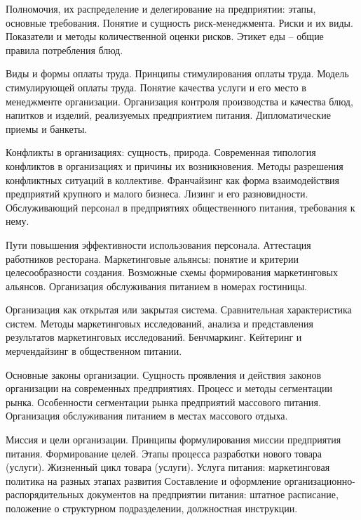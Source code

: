 \documentclass[
	11pt,
	a4paper,
	]
	{article}
\begin{document}
\bigskip

\noindent{} 
	{
		Полномочия, их распределение и делегирование на предприятии: этапы, основные требования.
	}{
		Понятие и сущность риск-менеджмента. Риски и их виды. Показатели и методы количественной оценки рисков.
	}{
		Этикет еды – общие правила потребления блюд.
	}

\bigskip

\noindent{} 
	{
		Виды и формы оплаты труда. Принципы стимулирования оплаты труда. Модель стимулирующей оплаты труда.
	}{
		Понятие качества услуги и его место в менеджменте организации. Организация контроля производства и качества блюд, напитков и изделий, реализуемых предприятием питания.
	}{
		Дипломатические приемы и банкеты.
	}

\bigskip

\noindent{} 
	{
		Конфликты в организациях: сущность, природа. Современная типология конфликтов в организациях и причины их возникновения. Методы разрешения конфликтных ситуаций в коллективе.
	}{
		Франчайзинг как форма взаимодействия предприятий крупного и малого бизнеса. Лизинг и его разновидности.
	}{
		Обслуживающий персонал в предприятиях общественного питания, требования к нему.
	}

\bigskip

\noindent{} 
	{
		Пути повышения эффективности использования персонала. Аттестация работников ресторана.
	}{
		Маркетинговые альянсы: понятие и критерии целесообразности создания. Возможные схемы формирования маркетинговых альянсов.
	}{
		Организация обслуживания питанием в номерах гостиницы.
	}

\bigskip

\noindent{} 
	{
		Организация как открытая или закрытая система. Сравнительная характеристика систем.
	}{
		Методы маркетинговых исследований, анализа и представления результатов маркетинговых исследований. Бенчмаркинг.
	}{
		Кейтеринг и мерчендайзинг в общественном питании.
	}

\bigskip

\noindent{} 
	{
		Основные законы организации. Сущность проявления и действия законов организации на современных предприятиях.
	}{
		Процесс и методы сегментации рынка. Особенности сегментации рынка предприятий массового питания.
	}{
		Организация обслуживания питанием в местах массового отдыха.
	}

\bigskip

\noindent{} 
	{
		Миссия и цели организации. Принципы формулирования миссии предприятия питания. Формирование целей.
	}{
		Этапы процесса разработки нового товара (услуги). Жизненный цикл товара (услуги). Услуга питания: маркетинговая политика на разных этапах развития
	}{
		Составление и оформление организационно-распорядительных документов на предприятии питания: штатное расписание, положение о структурном подразделении, должностная инструкции.
	}
\end{document}
